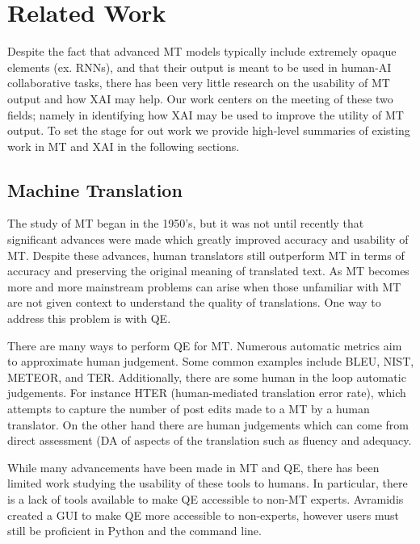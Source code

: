 \section{Related Work}

Despite the fact that advanced MT models typically include extremely opaque elements (ex. RNNs), and that their output is meant to be used in human-AI collaborative tasks\cite{mauvcec2019machine}, there has been very little research on the usability of MT output and how XAI may help. Our work centers on the meeting of these two fields; namely in identifying how XAI may be used to improve the utility of MT output. To set the stage for out work we provide high-level summaries of existing work in MT and XAI in the following sections.  

\subsection{Machine Translation} 

The study of MT began in the 1950's, but it was not until recently that significant advances were made which greatly improved accuracy and usability of MT. Despite these advances, human translators still outperform MT in terms of accuracy and preserving the original meaning of translated text\cite{mauvcec2019machine}. As MT becomes more and more mainstream problems can arise when those unfamiliar with MT are not given context to understand the quality of translations. One way to address this problem is with QE.  

There are many ways to perform QE for MT. Numerous automatic metrics aim to approximate human judgement. Some common examples include BLEU, NIST, METEOR, and TER. Additionally, there are some human in the loop automatic judgements. For instance HTER (human-mediated translation error rate), which attempts to capture the number of post edits made to a MT by a human translator\cite{mauvcec2019machine}. On the other hand there are human judgements which can come from direct assessment (DA of aspects of the translation such as fluency and adequacy\cite{snover2009Fluency}.           

While many advancements have been made in MT and QE, there has been limited work studying the usability of these tools to humans. In particular, there is a lack of tools available to make QE accessible to non-MT experts. Avramidis created a GUI to make QE more accessible to non-experts, however users must still be proficient in Python and the command line\cite{avramidis2017QE}.    

